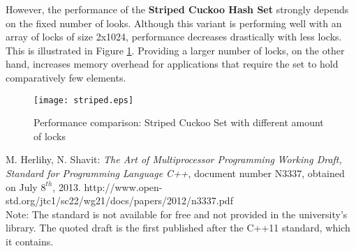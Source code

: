 \documentclass[a4paper,10pt]{article}
\begin{document}
However, the performance of the \textbf{Striped Cuckoo Hash Set} strongly
depends on the fixed number of looks. Although this variant is performing well
with an array of locks of size 2x1024, performance decreases drastically with
less locks. This is illustrated in Figure \ref{fig:plot3}. Providing a larger
number of locks, on the other hand, increases memory overhead for applications
that require the set to hold comparatively few elements.

\begin{figure}[H]
\begin{center}
\texttt{[image: striped.eps]}
\end{center}
\caption{Performance comparison: Striped Cuckoo Set with different amount of locks}
\label{fig:plot3}
\end{figure}


\begin{thebibliography}{9}
    M. Herlihy, N. Shavit:
   \emph{The Art of Multiprocessor Programming}
	\emph{Working Draft, Standard for Programming Language C++},
	document number N3337, obtained on July $8^{th}$, 2013.	
	http://www.open-std.org/jtc1/sc22/wg21/docs/papers/2012/n3337.pdf \\
    Note: The standard is not available for free and not provided in the
    university's  library. The quoted draft is the first published after the
    C++11 standard, which it contains.

\end{thebibliography}
\end{document}
